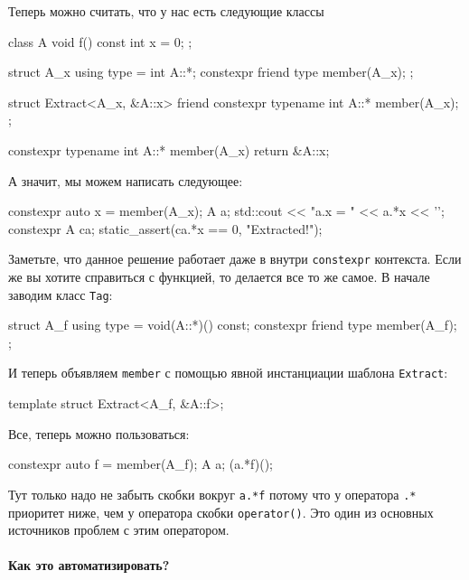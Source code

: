 Теперь можно считать, что у нас есть следующие классы
\begin{cppcode}
class A {
  void f() const {}
  int x = 0;
};

struct A_x {
  using type = int A::*;
  constexpr friend type member(A_x);
};

struct Extract<A_x, &A::x> {
  friend constexpr typename int A::* member(A_x);
};

constexpr typename int A::* member(A_x) {
  return &A::x;
}
\end{cppcode}
А значит, мы можем написать следующее:
\begin{cppcode}
constexpr auto x = member(A_x{});
A a;
std::cout << "a.x = " << a.*x << '\n';
constexpr A ca;
static_assert(ca.*x == 0, "Extracted!");
\end{cppcode}
Заметьте, что данное решение работает даже в внутри \verb"constexpr" контекста.
Если же вы хотите справиться с функцией, то делается все то же самое.
В начале заводим класс \verb"Tag":
\begin{cppcode}
struct A_f {
  using type = void(A::*)() const;
  constexpr friend type member(A_f);
};
\end{cppcode}
И теперь объявляем \verb"member" с помощью явной инстанциации шаблона \verb"Extract":
\begin{cppcode}
template struct Extract<A_f, &A::f>;
\end{cppcode}
Все, теперь можно пользоваться:
\begin{cppcode}
constexpr auto f = member(A_f{});
A a;
(a.*f)();
\end{cppcode}
Тут только надо не забыть скобки вокруг \verb"a.*f" потому что у оператора \verb".*" приоритет ниже, чем у оператора скобки \verb"operator()".
Это один из основных источников проблем с этим оператором.

\paragraph{Как это автоматизировать?}

